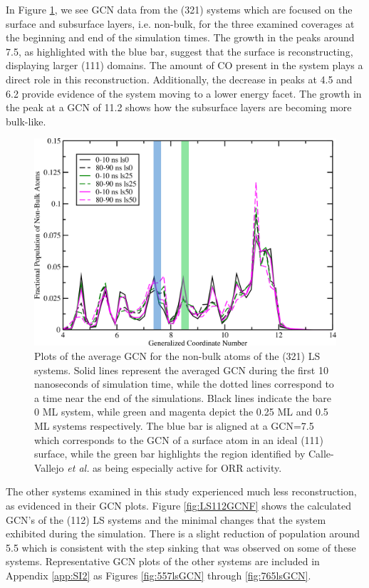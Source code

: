 In Figure \ref{fig:LS321GCNF}, we see GCN data from the  (321) systems
which are focused on the surface and subsurface layers, i.e. non-bulk, for the
three examined coverages at  the beginning and end of the simulation times. The
growth in the peaks around 7.5, as highlighted with the blue bar, suggest that
the surface is reconstructing, displaying larger (111) domains. The amount of
CO present in the system plays a direct role in this reconstruction.
Additionally, the decrease in peaks at 4.5 and 6.2 provide evidence of the
system moving to a lower energy facet.  The growth in the peak at a GCN of 11.2
shows how the subsurface layers are becoming more bulk-like.

\begin{figure}[p!]
  \includegraphics[width=\linewidth]{../figures/chap4/321ls_GCNF.pdf}
  \caption{Plots of the average GCN for the non-bulk atoms of the  (321)
LS systems.  Solid lines represent the averaged GCN during the first 10
nanoseconds of simulation time, while the dotted lines correspond to a time near
the end of the simulations. Black lines indicate the bare 0 ML system, while
green and magenta depict the 0.25 ML and 0.5 ML systems respectively. The blue
bar is aligned at a GCN=7.5 which corresponds to the GCN of a surface atom in
an ideal  (111) surface, while the green bar highlights the region
identified by Calle-Vallejo {\em et al.} as being especially active for ORR
activity.\citep{Calle-Vallejo:2015qq}}
\label{fig:LS321GCNF}
\end{figure}

The other systems examined in this study experienced much less reconstruction,
as evidenced in their GCN plots. Figure \ref{fig:LS112GCNF} shows the
calculated GCN's of the  (112) LS systems and the minimal changes that
the system exhibited during the simulation. There is a slight reduction of
population around 5.5 which is consistent with the step sinking that was
observed on some of these systems. Representative GCN plots of the other
systems are included in Appendix \ref{app:SI2} as Figures \ref{fig:557lsGCN}
through \ref{fig:765lsGCN}.

